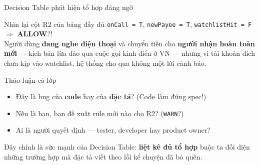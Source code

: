 \documentclass[aspectratio=169,12pt]{beamer}
\begin{document}
\begin{frame}{Decision Table phát hiện tổ hợp đáng ngờ}
  \begin{alertblock}{Nhìn lại cột R2 của bảng đầy đủ}
    \texttt{onCall = T}, \texttt{newPayee = T}, \texttt{watchlistHit = F}
    $\Rightarrow$ \textbf{ALLOW}?!\\[0.3em]
    Người dùng \textbf{đang nghe điện thoại} và chuyển tiền cho
    \textbf{người nhận hoàn toàn mới} --- kịch bản lừa đảo qua cuộc gọi
    kinh điển ở VN --- nhưng vì tài khoản đích chưa kịp vào watchlist,
    hệ thống cho qua không một lời cảnh báo.
  \end{alertblock}

  \vspace{0.4em}
  \begin{block}{Thảo luận cả lớp}
    \begin{itemize}
      \item Đây là bug của \textbf{code} hay của \textbf{đặc tả}? (Code làm đúng spec!)
      \item Nếu là bạn, bạn đề xuất rule mới nào cho R2? (\texttt{WARN}?)
      \item Ai là người quyết định --- tester, developer hay product owner?
    \end{itemize}
  \end{block}

  \vspace{0.2em}
  {\small Đây chính là sức mạnh của Decision Table: \textbf{liệt kê đủ tổ hợp}
  buộc ta đối diện những trường hợp mà đặc tả viết theo lối kể chuyện đã bỏ quên.}
\end{frame}
\end{document}
